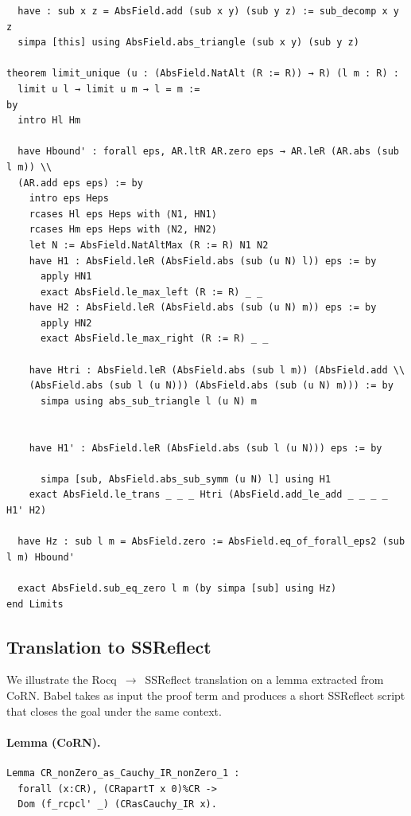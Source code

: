 \documentclass{article}
\begin{document}
\begin{verbatim}
  have : sub x z = AbsField.add (sub x y) (sub y z) := sub_decomp x y z
  simpa [this] using AbsField.abs_triangle (sub x y) (sub y z)

theorem limit_unique (u : (AbsField.NatAlt (R := R)) → R) (l m : R) :
  limit u l → limit u m → l = m :=
by
  intro Hl Hm

  have Hbound' : forall eps, AR.ltR AR.zero eps → AR.leR (AR.abs (sub l m)) \\
  (AR.add eps eps) := by
    intro eps Heps
    rcases Hl eps Heps with ⟨N1, HN1⟩
    rcases Hm eps Heps with ⟨N2, HN2⟩
    let N := AbsField.NatAltMax (R := R) N1 N2
    have H1 : AbsField.leR (AbsField.abs (sub (u N) l)) eps := by
      apply HN1
      exact AbsField.le_max_left (R := R) _ _
    have H2 : AbsField.leR (AbsField.abs (sub (u N) m)) eps := by
      apply HN2
      exact AbsField.le_max_right (R := R) _ _

    have Htri : AbsField.leR (AbsField.abs (sub l m)) (AbsField.add \\
    (AbsField.abs (sub l (u N))) (AbsField.abs (sub (u N) m))) := by
      simpa using abs_sub_triangle l (u N) m


    have H1' : AbsField.leR (AbsField.abs (sub l (u N))) eps := by

      simpa [sub, AbsField.abs_sub_symm (u N) l] using H1
    exact AbsField.le_trans _ _ _ Htri (AbsField.add_le_add _ _ _ _ H1' H2)

  have Hz : sub l m = AbsField.zero := AbsField.eq_of_forall_eps2 (sub l m) Hbound'

  exact AbsField.sub_eq_zero l m (by simpa [sub] using Hz)
end Limits
\end{verbatim}


\subsection{Translation to SSReflect}
\label{app:ssreflect}

We illustrate the Rocq~$\to$~SSReflect translation on a lemma extracted from CoRN. Babel takes as input the proof term and produces a short SSReflect script that closes the goal under the same context.

\paragraph{Lemma (CoRN).}
\begin{verbatim}
Lemma CR_nonZero_as_Cauchy_IR_nonZero_1 :
  forall (x:CR), (CRapartT x 0)%CR ->
  Dom (f_rcpcl' _) (CRasCauchy_IR x).
\end{verbatim}
\end{document}
